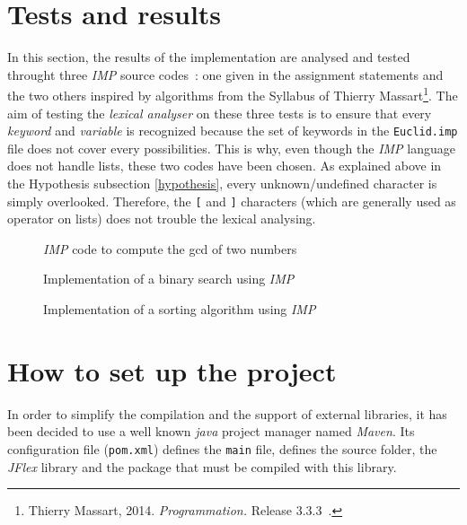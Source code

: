 \documentclass[a4paper,11pt]{article}
\begin{document}
\section{Tests and results} %
  In this section, the results of the implementation are analysed and tested throught three \textit{IMP} source codes~: one given in the assignment statements and the two others inspired by algorithms from the Syllabus of Thierry Massart\footnote{Thierry Massart, 2014. \textit{Programmation.} Release 3.3.3~.}. The aim of testing the \textit{lexical analyser} on these three tests is to ensure that every \textit{keyword} and \textit{variable} is recognized because the set of keywords in the \verb|Euclid.imp| file does not cover every possibilities. This is why, even though the \textit{IMP} language does not handle lists, these two codes have been chosen. As explained above in the Hypothesis subsection \ref{hypothesis}, every unknown/undefined character is simply overlooked. Therefore, the \verb|[| and \verb|]| characters (which are generally used as operator on lists) does not trouble the lexical analysing.
  \begin{figure}[h!] %
    
    \caption{\textit{IMP} code to compute the gcd of two numbers}
  \end{figure}
  \begin{figure}[h!] %
    
    \caption{Implementation of a binary search using \textit{IMP}}
  \end{figure}
  \begin{figure}[h!]
    
    \caption{Implementation of a sorting algorithm using \textit{IMP}}
  \end{figure}  

\section{How to set up the project}
  In order to simplify the compilation and the support of external libraries, it has been decided to use a well known \textit{java} project manager named \textit{Maven}. Its configuration file (\verb|pom.xml|) defines the \verb|main| file, defines the source folder, the \textit{JFlex} library and the package that must be compiled with this library.
\end{document}

